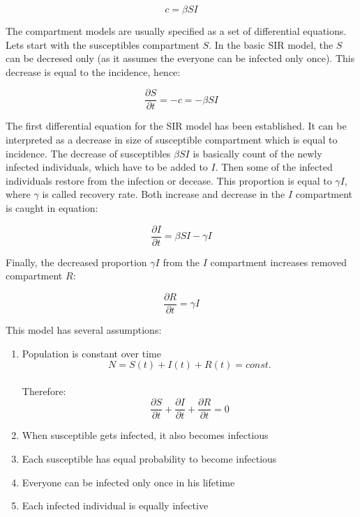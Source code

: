 \documentclass[
  digital, %
  oneside, %
  lof,     %
  lot,     %
]{fithesis4}
\begin{document}
\begin{equation}
	c = \beta S I
\end{equation}

The compartment models are usually specified as a set of
differential equations. Lets start with the susceptibles
compartment $S$. In the basic SIR model, the $S$
can be decresed only (as it assumes the everyone can be 
infected only once).
This decrease is equal to the incidence, hence:

\begin{equation}
	\frac{\partial{S}}{\partial{t}} = -c = -\beta S I
\end{equation}

The first differential equation for the SIR model has 
been established. It can be interpreted as a decrease 
in size of susceptible compartment which is equal 
to incidence.
The decrease of susceptibles $\beta S I$ is basically 
count of the newly infected individuals, which have 
to be added to $I$. 
Then some of the infected individuals restore from 
the infection or decease. 
This proportion is equal to $\gamma I$, where $\gamma$ 
is called recovery rate. Both increase and decrease in 
the $I$ compartment is caught in equation:

\begin{equation}
	\frac{\partial{I}}{\partial{t}} = \beta S I - \gamma I
\end{equation}

Finally, the decreased proportion $\gamma I$ from the 
$I$ compartment increases removed compartment $R$:

\begin{equation}
	\frac{\partial{R}}{\partial{t}} = \gamma I
\end{equation}

This model has several assumptions:

\begin{enumerate}
  \item Population is constant over time \\
    \begin{equation}
      N = S(t) + I(t) + R(t) = const.
    \end{equation} \\
    Therefore: \\
    \begin{equation}
      \frac{\partial{S}}{\partial{t}} + \frac{\partial{I}}{\partial{t}} + \frac{\partial{R}}{\partial{t}} = 0
    \end{equation}
  \item When susceptible gets infected, it also becomes infectious
  \item Each susceptible has equal probability to become infectious
  \item Everyone can be infected only once in his lifetime
  \item Each infected individual is equally infective \cite{volz2018}
\end{enumerate}
\end{document}

